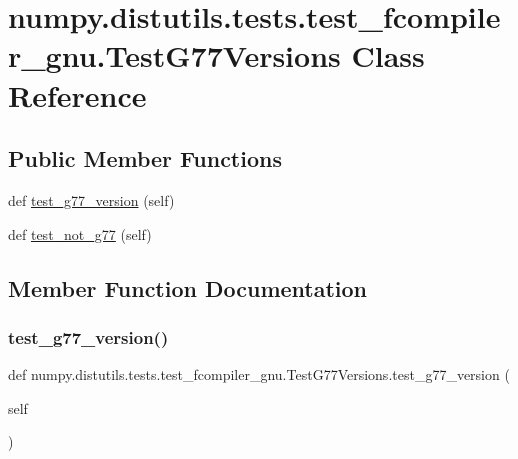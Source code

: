 \hypertarget{classnumpy_1_1distutils_1_1tests_1_1test__fcompiler__gnu_1_1TestG77Versions}{}\section{numpy.\+distutils.\+tests.\+test\+\_\+fcompiler\+\_\+gnu.\+Test\+G77\+Versions Class Reference}
\label{classnumpy_1_1distutils_1_1tests_1_1test__fcompiler__gnu_1_1TestG77Versions}
\subsection*{Public Member Functions}
\begin{DoxyCompactItemize}
\item 
def \hyperlink{classnumpy_1_1distutils_1_1tests_1_1test__fcompiler__gnu_1_1TestG77Versions_a3d2ab493a3778598a396d6c9dbacecf6}{test\+\_\+g77\+\_\+version} (self)
\item 
def \hyperlink{classnumpy_1_1distutils_1_1tests_1_1test__fcompiler__gnu_1_1TestG77Versions_a72337b75c39ae346f4ba25974f12dfb2}{test\+\_\+not\+\_\+g77} (self)
\end{DoxyCompactItemize}


\subsection{Member Function Documentation}
\mbox{\label{classnumpy_1_1distutils_1_1tests_1_1test__fcompiler__gnu_1_1TestG77Versions_a3d2ab493a3778598a396d6c9dbacecf6}} 
\subsubsection{\texorpdfstring{test\+\_\+g77\+\_\+version()}{test\_g77\_version()}}
{\footnotesize\ttfamily def numpy.\+distutils.\+tests.\+test\+\_\+fcompiler\+\_\+gnu.\+Test\+G77\+Versions.\+test\+\_\+g77\+\_\+version (\begin{DoxyParamCaption}\item[{}]{self }\end{DoxyParamCaption})}

